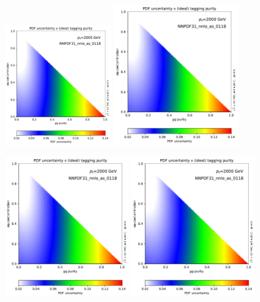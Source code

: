 \begin{figure}
\begin{center}
\includegraphics[width=0.42\textwidth, page=1]{figs/performance-plots.pdf} \hfill
\includegraphics[width=0.49\textwidth, page=2]{figs/performance-plots.pdf}
\caption{}
\label{fig:pdf_unc_studies} 
\end{center}
\end{figure}


\begin{figure}
\begin{center}
\includegraphics[width=0.49\textwidth, page=4]{figs/performance-plots.pdf} \hfill
\includegraphics[width=0.49\textwidth, page=5]{figs/performance-plots.pdf}
\caption{}
\label{fig:performance_studies} 
\end{center}
\end{figure}
